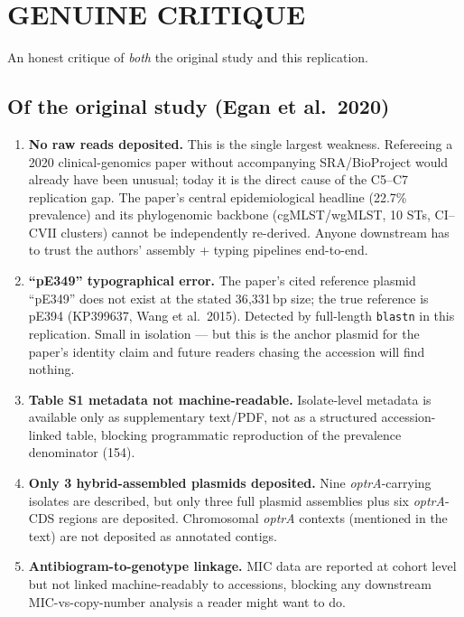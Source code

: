 \documentclass[11pt,letterpaper]{article}
\begin{document}
\section{GENUINE CRITIQUE}
An honest critique of \emph{both} the original study and this replication.

\subsection{Of the original study (Egan et al.\ 2020)}
\begin{enumerate}[leftmargin=*]
\item \textbf{No raw reads deposited.} This is the single largest weakness. Refereeing a 2020 clinical-genomics paper without accompanying SRA/BioProject would already have been unusual; today it is the direct cause of the C5--C7 replication gap. The paper's central epidemiological headline (22.7\% prevalence) and its phylogenomic backbone (cgMLST/wgMLST, 10 STs, CI--CVII clusters) cannot be independently re-derived. Anyone downstream has to trust the authors' assembly + typing pipelines end-to-end.
\item \textbf{``pE349'' typographical error.} The paper's cited reference plasmid ``pE349'' does not exist at the stated 36{,}331\,bp size; the true reference is pE394 (KP399637, Wang et al.\ 2015). Detected by full-length \texttt{blastn} in this replication. Small in isolation --- but this is the anchor plasmid for the paper's identity claim and future readers chasing the accession will find nothing.
\item \textbf{Table S1 metadata not machine-readable.} Isolate-level metadata is available only as supplementary text/PDF, not as a structured accession-linked table, blocking programmatic reproduction of the prevalence denominator (154).
\item \textbf{Only 3 hybrid-assembled plasmids deposited.} Nine \emph{optrA}-carrying isolates are described, but only three full plasmid assemblies plus six \emph{optrA}-CDS regions are deposited. Chromosomal \emph{optrA} contexts (mentioned in the text) are not deposited as annotated contigs.
\item \textbf{Antibiogram-to-genotype linkage.} MIC data are reported at cohort level but not linked machine-readably to accessions, blocking any downstream MIC-vs-copy-number analysis a reader might want to do.
\end{enumerate}
\end{document}
